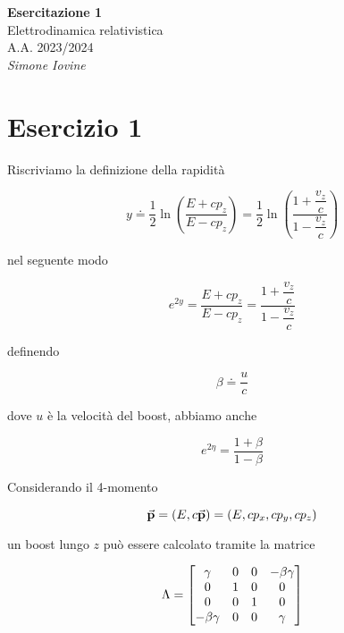 \documentclass[12pt]{report}
\begin{document}
	

\begin{center}
	{\Large
		\textbf{Esercitazione 1} \\
			Elettrodinamica relativistica \\
			A.A. 2023/2024 \\
			\vspace{0.7cm}
			\textit{Simone Iovine}
		}
\end{center}

\vspace{2cm}

%

\section*{Esercizio 1}

Riscriviamo la definizione della rapidità

\begin{equation}
	y \doteq \dfrac{1}{2} \ln(\dfrac{E + c p_{z}}{E - c p_{z}}) %
	= \dfrac{1}{2} \ln(\dfrac{1 + \dfrac{v_{z}}{c}}{1 - \dfrac{v_{z}}{c}})
\end{equation}

nel seguente modo

\begin{equation}
	e^{2 y} = \dfrac{E + c p_{z}}{E - c p_{z}} %
	= \dfrac{1 + \dfrac{v_{z}}{c}}{1 - \dfrac{v_{z}}{c}}
\end{equation}

definendo

\begin{equation}
	\beta \doteq \dfrac{u}{c}
\end{equation}

dove $u$ è la velocità del boost, abbiamo anche

\begin{equation}
	e^{2 \eta} = \dfrac{1 + \beta}{1 - \beta}
\end{equation}

Considerando il 4-momento

\begin{equation}
	\va{p} = (E, c \va{p}) %
	= (E, c p_{x}, c p_{y}, c p_{z})
\end{equation}

un boost lungo $z$ può essere calcolato tramite la matrice

\begin{equation}
	\Lambda = \bmqty{\gamma & 0 & 0 & - \beta \gamma \\
					0 & 1 & 0 & 0 \\
					0 & 0 & 1 & 0 \\
					- \beta \gamma & 0 & 0 & \gamma}
\end{equation}
\end{document}
